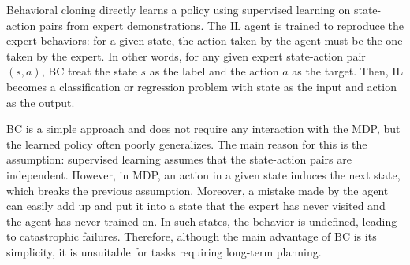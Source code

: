 Behavioral cloning directly learns a policy using supervised learning on state-action pairs from expert demonstrations.
The IL agent is trained to reproduce the expert behaviors: for a given state,
the action taken by the agent must be the one taken by the expert.
In other words,
for any given expert state-action
pair $(s,a)$,
BC treat the state $s$ as the label and the action $a$ as the target.
Then,
IL becomes a classification or regression problem with state as the input and action as the output.

BC is a simple approach and does not require any interaction with the MDP,
but the learned policy often poorly generalizes.
The main reason for this is the assumption: supervised learning assumes that the state-action pairs are independent.
However,
in MDP,
an action in a given state induces the next state,
which breaks the previous assumption.
Moreover,
a mistake made by the agent can easily add up and put it into a state that the expert has never visited and the agent has never trained on.
In such states,
the behavior is undefined,
leading to catastrophic failures.
Therefore,
although the main advantage of BC is its simplicity,
it is unsuitable for tasks requiring long-term planning.
